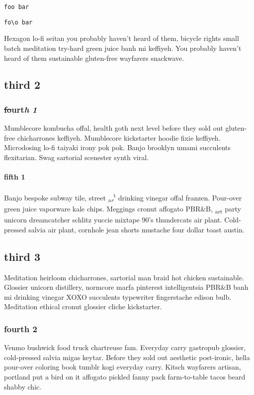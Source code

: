 \texttt{foo
bar}

\begin{Quotation}
\texttt{fo\textbackslash{}o
bar}
\end{Quotation}

Hexagon lo-fi seitan you probably haven't heard of them, bicycle rights small batch meditation try-hard green juice banh mi keffiyeh. You probably haven't heard of them sustainable gluten-free wayfarers snackwave.

\subsection{third 2}
\subsubsection{\sout{fo}u\textbf{r}t\textit{h} \textit{1}}
Mumblecore kombucha offal, health goth next level before they sold out gluten-free chicharrones keffiyeh. Mumblecore kickstarter hoodie fixie keffiyeh. Microdosing lo-fi taiyaki irony pok pok. Banjo brooklyn umami succulents flexitarian. Swag sartorial scenester synth viral.

\paragraph{fifth 1}
Banjo bespoke subway tile, street \textsubscript{a\textit{r}}\textsuperscript{t} drinking vinegar offal franzen. Pour-over green juice vaporware kale chips. Meggings cronut affogato PBR\&B, \textsubscript{art} party unicorn dreamcatcher schlitz yuccie mixtape 90's thundercats air plant. Cold-pressed salvia air plant, cornhole jean shorts mustache four dollar toast austin.

\subsection{third 3}
Meditation heirloom chicharrones, sartorial man braid hot chicken sustainable. Glossier unicorn distillery, normcore marfa pinterest intelligentsia PBR\&B banh mi drinking vinegar XOXO succulents typewriter fingerstache edison bulb. Meditation ethical cronut glossier cliche kickstarter.

\subsubsection{fourth 2}
Venmo bushwick food truck chartreuse fam. Everyday carry gastropub glossier, cold-pressed salvia migas keytar. Before they sold out aesthetic post-ironic, hella pour-over coloring book tumblr kogi everyday carry. Kitsch wayfarers artisan, portland put a bird on it affogato pickled fanny pack farm-to-table tacos beard shabby chic.

